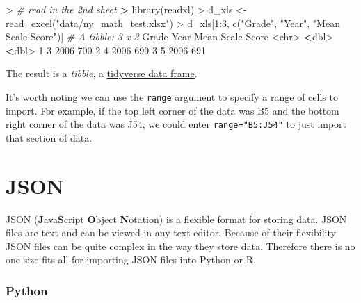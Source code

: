 \documentclass[
]{book}
\newenvironment{Shaded}{\begin{snugshade}}{\end{snugshade}}
\newcommand{\AttributeTok}[1]{\textcolor[rgb]{0.77,0.63,0.00}{#1}}
\newcommand{\CommentTok}[1]{\textcolor[rgb]{0.56,0.35,0.01}{\textit{#1}}}
\newcommand{\DecValTok}[1]{\textcolor[rgb]{0.00,0.00,0.81}{#1}}
\newcommand{\ErrorTok}[1]{\textcolor[rgb]{0.64,0.00,0.00}{\textbf{#1}}}
\newcommand{\FunctionTok}[1]{\textcolor[rgb]{0.00,0.00,0.00}{#1}}
\newcommand{\NormalTok}[1]{#1}
\newcommand{\OtherTok}[1]{\textcolor[rgb]{0.56,0.35,0.01}{#1}}
\newcommand{\SpecialCharTok}[1]{\textcolor[rgb]{0.00,0.00,0.00}{#1}}
\newcommand{\StringTok}[1]{\textcolor[rgb]{0.31,0.60,0.02}{#1}}
\begin{document}
\begin{Shaded}
\begin{Highlighting}[]
\SpecialCharTok{\textgreater{}} \CommentTok{\# read in the 2nd sheet}
\ErrorTok{\textgreater{}} \FunctionTok{library}\NormalTok{(readxl)}
\SpecialCharTok{\textgreater{}}\NormalTok{ d\_xls }\OtherTok{\textless{}{-}} \FunctionTok{read\_excel}\NormalTok{(}\StringTok{"data/ny\_math\_test.xlsx"}\NormalTok{)}
\SpecialCharTok{\textgreater{}}\NormalTok{ d\_xls[}\DecValTok{1}\SpecialCharTok{:}\DecValTok{3}\NormalTok{, }\FunctionTok{c}\NormalTok{(}\StringTok{"Grade"}\NormalTok{, }\StringTok{"Year"}\NormalTok{, }\StringTok{"Mean Scale Score"}\NormalTok{)]}
\CommentTok{\# A tibble: 3 x 3}
\NormalTok{  Grade  Year }\StringTok{\textasciigrave{}}\AttributeTok{Mean Scale Score}\StringTok{\textasciigrave{}}
  \SpecialCharTok{\textless{}}\NormalTok{chr}\SpecialCharTok{\textgreater{}} \ErrorTok{\textless{}}\NormalTok{dbl}\SpecialCharTok{\textgreater{}}              \ErrorTok{\textless{}}\NormalTok{dbl}\SpecialCharTok{\textgreater{}}
\DecValTok{1} \DecValTok{3}      \DecValTok{2006}                \DecValTok{700}
\DecValTok{2} \DecValTok{4}      \DecValTok{2006}                \DecValTok{699}
\DecValTok{3} \DecValTok{5}      \DecValTok{2006}                \DecValTok{691}
\end{Highlighting}
\end{Shaded}

The result is a \emph{tibble}, a \href{https://tibble.tidyverse.org/}{tidyverse data frame}.

It's worth noting we can use the \texttt{range} argument to specify a range of cells to import. For example, if the top left corner of the data was B5 and the bottom right corner of the data was J54, we could enter \texttt{range="B5:J54"} to just import that section of data.

\hypertarget{json}{%
\section{JSON}\label{json}}

JSON (\textbf{J}ava\textbf{S}cript \textbf{O}bject \textbf{N}otation) is a flexible format for storing data. JSON files are text and can be viewed in any text editor. Because of their flexibility JSON files can be quite complex in the way they store data. Therefore there is no one-size-fits-all for importing JSON files into Python or R.

\hypertarget{python-12}{%
\subsubsection*{Python}\label{python-12}}
\end{document}
